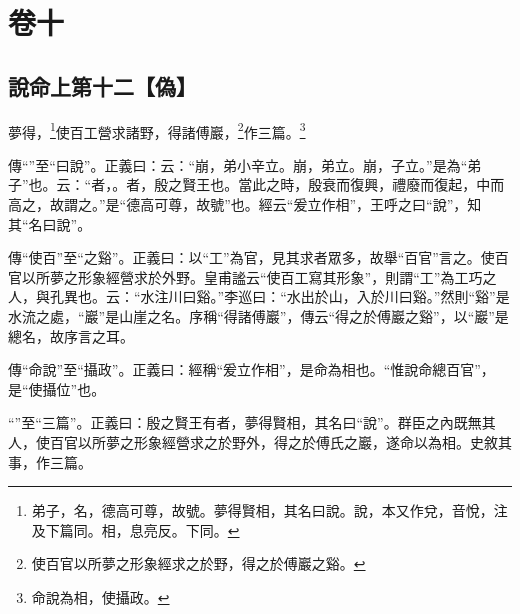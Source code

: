 

\chapter{卷十}


\section{說命上第十二【偽】}


夢得，\footnote{弟子，名，德高可尊，故號。夢得賢相，其名曰說。說，本又作兌，音悅，注及下篇同。相，息亮反。下同。}使百工營求諸野，得諸傅巖，\footnote{使百官以所夢之形象經求之於野，得之於傅巖之谿。}作三篇。\footnote{命說為相，使攝政。}


{\noindent\zhuan{}\fzbyks 傳“”至“曰說”。正義曰：云：“崩，弟小辛立。崩，弟立。崩，子立。”是為“弟子”也。云：“者，。者，殷之賢王也。當此之時，殷衰而復興，禮廢而復起，中而高之，故謂之。”是“德高可尊，故號”也。經云“爰立作相”，王呼之曰“說”，知其“名曰說”。 \par}

{\noindent\zhuan{}\fzbyks 傳“使百”至“之谿”。正義曰：以“工”為官，見其求者眾多，故舉“百官”言之。使百官以所夢之形象經營求於外野。皇甫謐云“使百工寫其形象”，則謂“工”為工巧之人，與孔異也。云：“水注川曰谿。”李巡曰：“水出於山，入於川曰谿。”然則“谿”是水流之處，“巖”是山崖之名。序稱“得諸傅巖”，傳云“得之於傅巖之谿”，以“巖”是總名，故序言之耳。 \par}

{\noindent\zhuan{}\fzbyks 傳“命說”至“攝政”。正義曰：經稱“爰立作相”，是命為相也。“惟說命總百官”，是“使攝位”也。 \par}

{\noindent\shu{}\fzkt “”至“三篇”。正義曰：殷之賢王有者，夢得賢相，其名曰“說”。群臣之內既無其人，使百官以所夢之形象經營求之於野外，得之於傅氏之巖，遂命以為相。史敘其事，作三篇。 \par}

